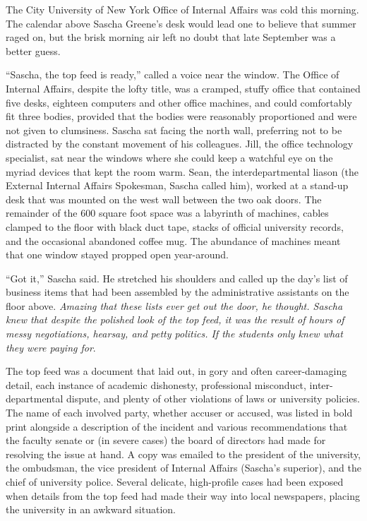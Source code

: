 \documentclass[12pt]{book}
\begin{document}
The City University of New York Office of Internal Affairs was cold this morning.  The calendar above Sascha Greene's desk would lead one to believe that summer raged on, but the brisk morning air left no doubt that late September was a better guess.

``Sascha, the top feed is ready,'' called a voice near the window.  The Office of Internal Affairs, despite the lofty title, was a cramped, stuffy office that contained five desks, eighteen computers and other office machines, and could comfortably fit three bodies, provided that the bodies were reasonably proportioned and were not given to clumsiness.  Sascha sat facing the north wall, preferring not to be distracted by the constant movement of his colleagues.  Jill, the office technology specialist, sat near the windows where she could keep a watchful eye on the myriad devices that kept the room warm.  Sean, the interdepartmental liason (the External Internal Affairs Spokesman, Sascha called him), worked at a stand-up desk that was mounted on the west wall between the two oak doors.  The remainder of the 600 square foot space was a labyrinth of machines, cables clamped to the floor with black duct tape, stacks of official university records, and the occasional abandoned coffee mug.  The abundance of machines meant that one window stayed propped open year-around.

``Got it,'' Sascha said.  He stretched his shoulders and called up the day's list of business items that had been assembled by the administrative assistants on the floor above.  \emph{Amazing that these lists ever get out the door\emph{, he thought.  Sascha knew that despite the polished look of the top feed, it was the result of hours of messy negotiations, hearsay, and petty politics.  }If the students only knew what they were paying for}.

The top feed was a document that laid out, in gory and often career-damaging detail, each instance of academic dishonesty, professional misconduct, inter-departmental dispute, and plenty of other violations of laws or university policies.  The name of each involved party, whether accuser or accused, was listed in bold print alongside a description of the incident and various recommendations that the faculty senate or (in severe cases) the board of directors had made for resolving the issue at hand.  A copy was emailed to the president of the university, the ombudsman, the vice president of Internal Affairs (Sascha's superior), and the chief of university police.  Several delicate, high-profile cases had been exposed when details from the top feed had made their way into local newspapers, placing the university in an awkward situation.
\end{document}
